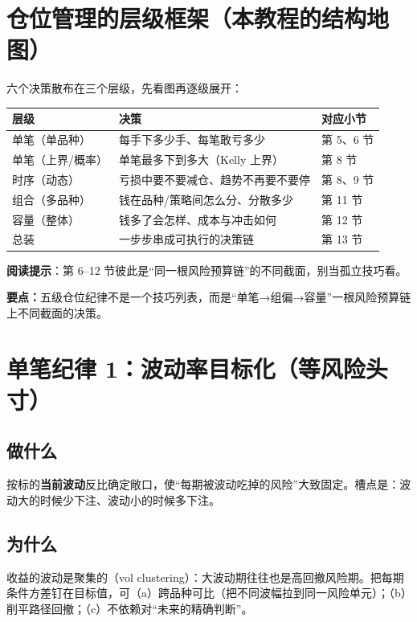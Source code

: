 \documentclass[UTF8,11pt]{ctexart}
\newcommand{\takeaway}[1]{\medskip\par\noindent\textbf{要点：}#1\par\medskip}
\begin{document}
\section{仓位管理的层级框架（本教程的结构地图）}
六个决策散布在三个层级，先看图再逐级展开：
\begin{center}
\renewcommand{\arraystretch}{1.45}
\begin{tabular}{@{}lll@{}}
\toprule
层级 & 决策 & 对应小节 \\
\midrule
单笔（单品种） & 每手下多少手、每笔敢亏多少 & 第 5、6 节 \\
单笔（上界/概率） & 单笔最多下到多大（Kelly 上界） & 第 8 节 \\
时序（动态） & 亏损中要不要减仓、趋势不再要不要停 & 第 8、9 节 \\
组合（多品种） & 钱在品种/策略间怎么分、分散多少 & 第 11 节 \\
容量（整体） & 钱多了会怎样、成本与冲击如何 & 第 12 节 \\
总装 & 一步步串成可执行的决策链 & 第 13 节 \\
\bottomrule
\end{tabular}
\end{center}
\textbf{阅读提示}：第 6--12 节彼此是“同一根风险预算链”的不同截面，别当孤立技巧看。

\takeaway{五级仓位纪律不是一个技巧列表，而是“单笔→组偏→容量”一根风险预算链上不同截面的决策。}

\section{单笔纪律 1：波动率目标化（等风险头寸）}
\subsection{做什么}
按标的\textbf{当前波动}反比确定敞口，使“每期被波动吃掉的风险”大致固定。槽点是：波动大的时候少下注、波动小的时候多下注。
\subsection{为什么}
收益的波动是聚集的（vol clustering）：大波动期往往也是高回撤风险期。把每期条件方差钉在目标值，可（a）跨品种可比（把不同波幅拉到同一风险单元）；（b）削平路径回撤；（c）不依赖对“未来的精确判断”。
\end{document}
